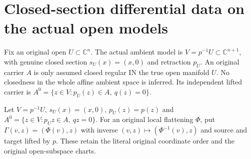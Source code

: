 \section{Closed-section differential data on the actual open models}

Fix an original open $U\subset\mathbb C^n$. The actual ambient model is $V=p^{-1}U\subset\mathbb C^{n+1}$, with genuine closed section $s_U(x)=(x,0)$ and retraction $p_U$. An original carrier $A$ is only assumed closed regular IN the true open manifold $U$. No closedness in the whole affine ambient space is inferred. Its independent lifted carrier is $A^0=\{z\in V:p_U(z)\in A,\ q(z)=0\}$.

\begin{definition}
\label{hir:actual-open-zero-section-models}
\leanok
Let $V=p^{-1}U$, $s_U(x)=(x,0)$, $p_U(z)=p(z)$ and $A^0=\{z\in V:p_Uz\in A,\ qz=0\}$. For an original local flattening $\Phi$, put $\Gamma(v,z)=(\Phi(v),z)$ with inverse $(v,z)\mapsto(\Phi^{-1}(v),z)$ and source and target lifted by $p$. These retain the literal original coordinate order and the original open-subspace charts.
\end{definition}

